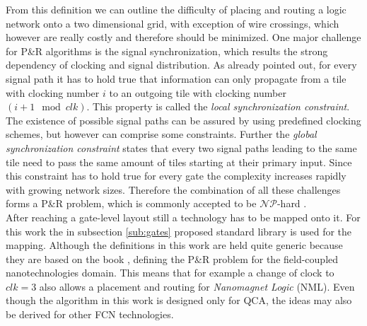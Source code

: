From this definition we can outline the difficulty of placing and routing a logic network onto a two dimensional grid, with exception of wire crossings, which however are really costly and therefore should be minimized. One major challenge for P\&R algorithms is the signal synchronization, which results the strong dependency of clocking and signal distribution. As already pointed out, for every signal path it has to hold true that information can only propagate from a tile with clocking number $i$ to an outgoing tile with clocking number $(i+1 \mod clk)$. This property is called the \textit{local synchronization constraint}. The existence of possible signal paths can be assured by using predefined clocking schemes, but however can comprise some constraints. Further the \textit{global synchronization constraint} states that every two signal paths leading to the same tile need to pass the same amount of tiles starting at their primary input. Since this constraint has to hold true for every gate the complexity increases rapidly with growing network sizes. Therefore the combination of all these challenges forms a P\&R problem, which is commonly accepted to be $\mathcal{NP}$-hard \cite{NP-hard}. \\
After reaching a gate-level layout still a technology has to be mapped onto it. For this work the in subsection \ref{sub:gates} proposed standard library is used for the mapping. Although the definitions in this work are held quite generic because they are based on the book \cite{Walter}, defining the P\&R problem for the field-coupled nanotechnologies domain. This means that for example a change of clock to $clk = 3$ also allows a placement and routing for \textit{Nanomagnet Logic} (NML). Even though the algorithm in this work is designed only for QCA, the ideas may also be derived for other FCN technologies.